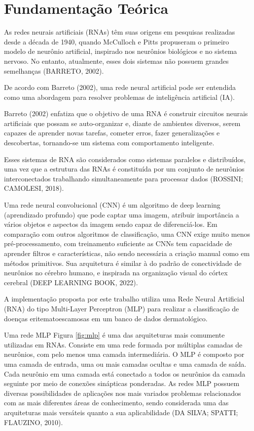 \documentclass[conference]{IEEEtran}
\begin{document}
\section{Fundamentação Teórica}
As redes neurais artificiais (RNAs) têm suas origens em pesquisas realizadas desde a década de 1940, quando McCulloch e Pitts propuseram o primeiro modelo de neurônio artificial, inspirado nos neurônios biológicos e no sistema nervoso. No entanto, atualmente, esses dois sistemas não possuem grandes semelhanças (BARRETO, 2002).

De acordo com Barreto (2002), uma rede neural artificial pode ser entendida como uma abordagem para resolver problemas de inteligência artificial (IA).

Barreto (2002) enfatiza que o objetivo de uma RNA é construir circuitos neurais artificiais que possam se auto-organizar e, diante de ambientes diversos, serem capazes de aprender novas tarefas, cometer erros, fazer generalizações e descobertas, tornando-se um sistema com comportamento inteligente.

Esses sistemas de RNA são considerados como sistemas paralelos e distribuídos, uma vez que a estrutura das RNAs é constituída por um conjunto de neurônios interconectados trabalhando simultaneamente para processar dados (ROSSINI; CAMOLESI, 2018).

Uma rede neural convolucional (CNN) é um algoritmo de deep learning (aprendizado
profundo) que pode captar uma imagem, atribuir importância a vários objetos e aspectos da
imagem sendo capaz de diferenciá-los. Em comparação com outros algoritmos de
classificação, uma CNN exige muito menos pré-processamento, com treinamento suficiente
as CNNs tem capacidade de aprender filtros e características, não sendo necessária a criação
manual como em métodos primitivos. Sua arquitetura é similar à do padrão de conectividade
de neurônios no cérebro humano, e inspirada na organização visual do córtex cerebral (DEEP LEARNING BOOK, 2022).

A implementação proposta por este trabalho utiliza uma Rede Neural Artificial (RNA) do tipo Multi-Layer Perceptron (MLP) para realizar a classificação de doenças eritematoescamosas em um banco de dados dermatológico.

Uma rede MLP Figura \ref{fig:mlp} é uma das arquiteturas mais comumente utilizadas em RNAs. Consiste em uma rede formada por múltiplas camadas de neurônios, com pelo menos uma camada intermediária. O MLP é composto por uma camada de entrada, uma ou mais camadas ocultas e uma camada de saída. Cada neurônio em uma camada está conectado a todos os neurônios da camada seguinte por meio de conexões sinápticas ponderadas. As redes MLP possuem diversas possibilidades de aplicações nos mais variados problemas relacionados com as mais diferentes áreas de conhecimento, sendo considerada uma das arquiteturas mais versáteis quanto a sua aplicabilidade  (DA SILVA; SPATTI; FLAUZINO, 2010).
\end{document}
